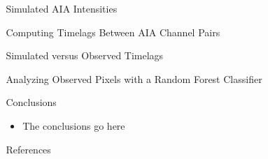 \documentclass[final,12pt]{beamer}
\begin{document}
\begin{frame}
\begin{columns}[T]
\begin{column}{0.49\linewidth}
  \end{column}
  \begin{column}{0.49\linewidth}
    \begin{block}{Simulated AIA Intensities}
    \end{block}
    \begin{block}{Computing Timelags Between AIA Channel Pairs}
    \end{block}
    \begin{block}{Simulated versus Observed Timelags}
    \end{block}
    \begin{block}{Analyzing Observed Pixels with a Random Forest Classifier}
    \end{block}
    \begin{block}{Conclusions}
      \begin{itemize}
        \item The conclusions go here
      \end{itemize}
    \end{block}
    \begin{block}{References}
      \scriptsize
      \begin{multicols}{2}
        
        
      \end{multicols}
    \end{block}
  \end{column}
  \end{columns}
\end{frame}
\end{document}
